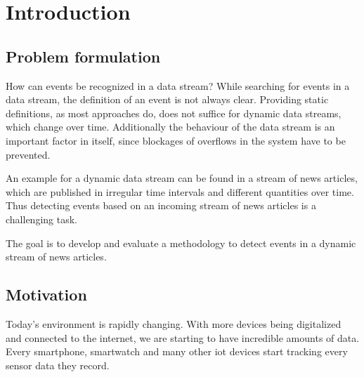 \section{Introduction}

\subsection{Problem formulation}




How can events be recognized in a data stream?
While searching for events in a data stream, the definition of an event is not always clear.
Providing static definitions, as most approaches do,
does not suffice for dynamic data streams, which change over time.
Additionally the behaviour of the data stream is an important factor in itself,
since blockages of overflows in the system have to be prevented.

An example for a dynamic data stream can be found in a stream of news articles, which are published in irregular time intervals and different quantities over time. Thus detecting events based on an incoming stream of news articles is a challenging task. 

The goal is to develop and evaluate a methodology to detect events in a dynamic stream of news articles.

\subsection{Motivation}
Today's environment is rapidly changing.
With more devices being digitalized and connected to the internet,
we are starting to have incredible amounts of data.
Every smartphone, smartwatch and many other \gls{iot} devices start tracking every sensor data they record.

